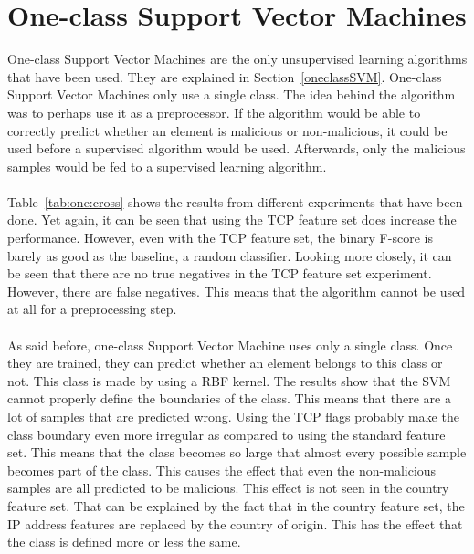 \section{One-class Support Vector Machines}
\label{eval:oneclass}
One-class Support Vector Machines are the only unsupervised learning algorithms that have been used. They are explained in Section~\ref{oneclassSVM}. One-class Support Vector Machines only use a single class. The idea behind the algorithm was to perhaps use it as a preprocessor. If the algorithm would be able to correctly predict whether an element is malicious or non-malicious, it could be used before a supervised algorithm would be used. Afterwards, only the malicious samples would be fed to a supervised learning algorithm.\\
\\
Table~\ref{tab:one:cross} shows the results from different experiments that have been done. Yet again, it can be seen that using the TCP feature set does increase the performance. However, even with the TCP feature set, the binary F-score is barely as good as the baseline, a random classifier. Looking more closely, it can be seen that there are no true negatives in the TCP feature set experiment. However, there are false negatives. This means that the algorithm cannot be used at all for a preprocessing step. \\
\\
As said before, one-class Support Vector Machine uses only a single class. Once they are trained, they can predict whether an element belongs to this class or not. This class is made by using a RBF kernel. The results show that the SVM cannot properly define the boundaries of the class. This means that there are a lot of samples that are predicted wrong. Using the TCP flags probably make the class boundary even more irregular as compared to using the standard feature set. This means that the class becomes so large that almost every possible sample becomes part of the class. This causes the effect that even the non-malicious samples are all predicted to be malicious.  This effect is not seen in the country feature set. That can be explained by the fact that in the country feature set, the IP address features are replaced by the country of origin. This has the effect that the class is defined more or less the same. 

